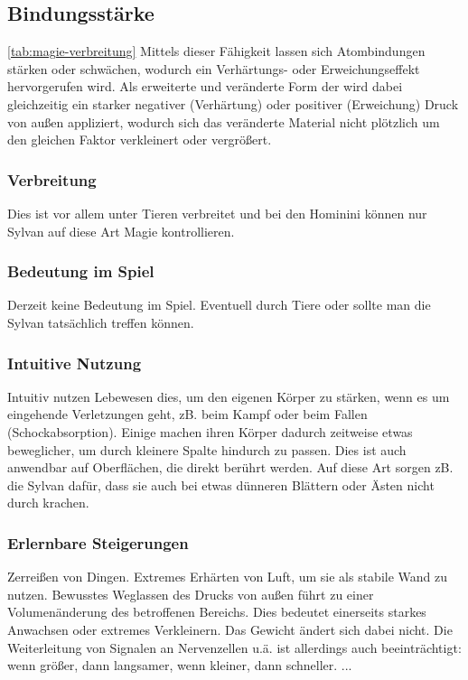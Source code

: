 \subsection{Bindungsstärke}\label{sec:bindungsmagie} \ref{tab:magie-verbreitung}
Mittels dieser Fähigkeit lassen sich Atombindungen stärken oder schwächen, wodurch ein Verhärtungs- oder Erweichungseffekt hervorgerufen wird. Als erweiterte und veränderte Form der  wird dabei gleichzeitig ein starker negativer (Verhärtung) oder positiver (Erweichung) Druck von außen appliziert, wodurch sich das veränderte Material nicht plötzlich um den gleichen Faktor verkleinert oder vergrößert.

\subsubsection{Verbreitung}
Dies ist vor allem unter Tieren verbreitet und bei den Hominini können nur Sylvan auf diese Art Magie kontrollieren.

\subsubsection{Bedeutung im Spiel}
Derzeit keine Bedeutung im Spiel. Eventuell durch Tiere oder sollte man die Sylvan tatsächlich treffen können.

\subsubsection{Intuitive Nutzung}
Intuitiv nutzen Lebewesen dies, um den eigenen Körper zu stärken, wenn es um eingehende Verletzungen geht, zB. beim Kampf oder beim Fallen (Schockabsorption). Einige machen ihren Körper dadurch zeitweise etwas beweglicher, um durch kleinere Spalte hindurch zu passen. Dies ist auch anwendbar auf Oberflächen, die direkt berührt werden. Auf diese Art sorgen zB. die Sylvan dafür, dass sie auch bei etwas dünneren Blättern oder Ästen nicht durch krachen.

\subsubsection{Erlernbare Steigerungen}
\begin{outline}
	\1 Zerreißen von Dingen.
	\1 Extremes Erhärten von Luft, um sie als stabile Wand zu nutzen.
	\1 Bewusstes Weglassen des Drucks von außen führt zu einer Volumenänderung des betroffenen Bereichs. Dies bedeutet einerseits starkes Anwachsen oder extremes Verkleinern. Das Gewicht ändert sich dabei nicht. Die Weiterleitung von Signalen an Nervenzellen u.ä. ist allerdings auch beeinträchtigt: wenn größer, dann langsamer, wenn kleiner, dann schneller.
	\1 ...
\end{outline}

